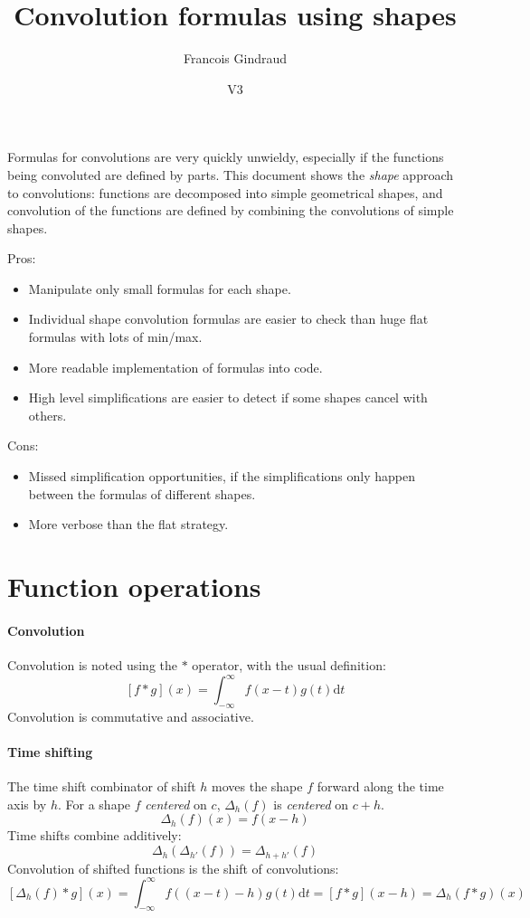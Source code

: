 \documentclass[a4paper,10pt]{article}
\title{Convolution formulas using shapes}
\author{Francois Gindraud}
\date{V3}
\newcommand\Shifted[2]{\Delta_{#1}(#2)}
\newcommand\D{\mathrm{d}}
\newcommand\Convolution{\ast}
\newcommand\IntR[2]{\int_{-\infty}^{\infty}#1 \D#2}
\begin{document}
\maketitle

Formulas for convolutions are very quickly unwieldy, especially if the functions being convoluted are defined by parts.
This document shows the \emph{shape} approach to convolutions: functions are decomposed into simple geometrical shapes, and convolution of the functions are defined by combining the convolutions of simple shapes.

Pros:
\begin{itemize}
    \item Manipulate only small formulas for each shape.
    \item Individual shape convolution formulas are easier to check than huge flat formulas with lots of min/max.
    \item More readable implementation of formulas into code.
    \item High level simplifications are easier to detect if some shapes cancel with others.
\end{itemize}
Cons:
\begin{itemize}
    \item Missed simplification opportunities, if the simplifications only happen between the formulas of different shapes.
    \item More verbose than the flat strategy.
\end{itemize}

\section{Function operations}

\paragraph{Convolution}
Convolution is noted using the $\Convolution$ operator, with the usual definition:
\[ \left[ f \Convolution g \right](x) = \IntR{f(x - t) g(t)}{t} \]
Convolution is commutative and associative.

\paragraph{Time shifting}
The time shift combinator of shift $h$ moves the shape $f$ forward along the time axis by $h$.
For a shape $f$ \emph{centered} on $c$, $\Shifted{h}{f}$ is \emph{centered} on $c+h$.
\[ \Shifted{h}{f}(x) = f(x - h) \]
Time shifts combine additively:
\[ \Shifted{h}{\Shifted{h'}{f}}= \Shifted{h+h'}{f} \]
Convolution of shifted functions is the shift of convolutions:
\[
    \left[ \Shifted{h}{f} \Convolution g \right](x) =
    \IntR{ f((x - t) - h) g(t) }{t} =
    \left[ f \Convolution g \right](x-h) =
    \Shifted{h}{f \Convolution g}(x)
\]
\end{document}
